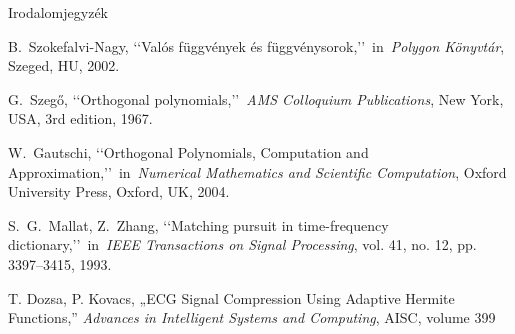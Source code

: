 \documentclass{beamer}
\begin{document}
\begin{frame}{Irodalomjegyzék}
\begin{thebibliography}{9}
\linespread{1.0}

 B.~Szokefalvi-Nagy, \lq\lq Valós függvények és függvénysorok,\rq\rq~in~\emph{Polygon Könyvtár}, Szeged, HU, 2002.

 G.~Szeg\H{o}, \lq\lq Orthogonal polynomials,\rq\rq~\emph{AMS Colloquium Publications}, New York, USA, 3rd edition, 1967.

 W.~Gautschi, \lq\lq Orthogonal Polynomials, Computation and Approximation,\rq\rq~in~\emph{Numerical Mathematics and Scientific Computation}, Oxford University Press, Oxford,
UK, 2004.

 S.~G.~Mallat, Z.~Zhang, \lq\lq Matching pursuit in time-frequency dictionary,\rq\rq~in~\emph{IEEE Transactions on Signal Processing}, vol. 41, no. 12, pp. 3397–3415, 1993.

T. Dozsa, P. Kovacs,
„ECG Signal Compression Using Adaptive Hermite Functions,”
\textit{ Advances in Intelligent Systems and Computing},
AISC, volume 399


\end{thebibliography}
\end{frame}

\begin{frame}{}
\end{frame}
\end{document}
